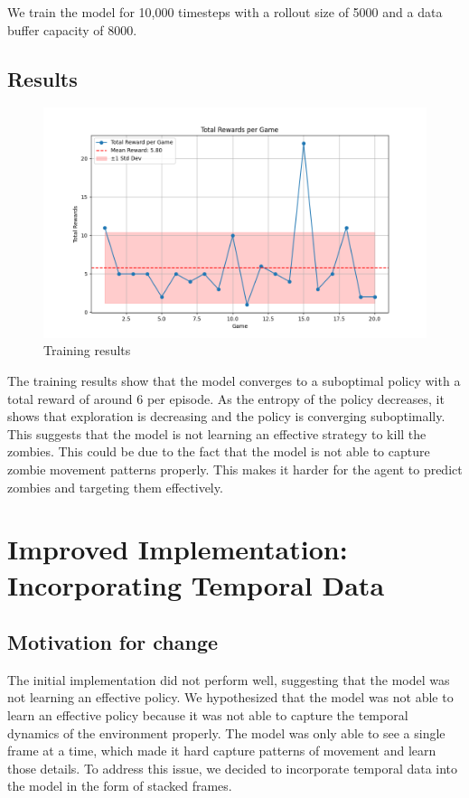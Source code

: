 \documentclass{article}
\begin{document}
We train the model for 10,000 timesteps with a rollout size of 5000 and a data buffer capacity of 8000.


\subsection{Results}

\begin{figure}[h]
  \centering
  \includegraphics[scale=0.6]{rewards2.png}
  \caption{Training results}
  \label{fig:training_results_no_temporal}
\end{figure}

The training results show that the model converges to a suboptimal policy with a total reward of around 6 per episode. As the entropy 
of the policy decreases, it shows that exploration is decreasing and the policy is converging suboptimally. This suggests that the model is not learning
an effective strategy to kill the zombies. This could be due to the fact that the model is not able to capture zombie movement patterns properly. This makes it 
harder for the agent to predict zombies and targeting them effectively.

\section{Improved Implementation: Incorporating Temporal Data}
\subsection{Motivation for change}
The initial implementation did not perform well, suggesting that the model was not learning an effective policy. We hypothesized that the model
was not able to learn an effective policy because it was not able to capture the temporal dynamics of the environment properly. The model was only able to see
a single frame at a time, which made it hard capture patterns of movement and learn those details. 
To address this issue, we decided to incorporate temporal data into the model in the form of stacked frames.
\end{document}

